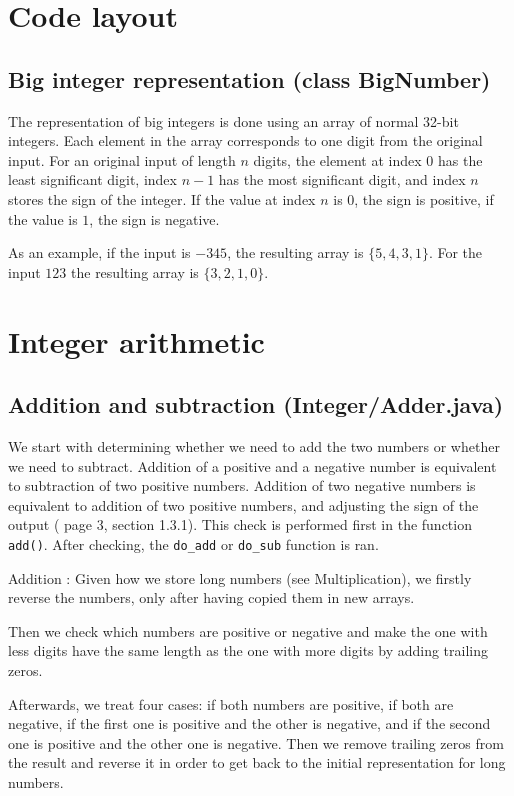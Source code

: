\documentclass[a4paper]{article}
\begin{document}
\section{Code layout}

\subsection{Big integer representation (class BigNumber)}

The representation of big integers is done using an array of normal 32-bit integers.
Each element in the array corresponds to one digit from the original input.
For an original input of length $n$ digits, the element at index $0$ has the least significant digit,
index $n-1$ has the most significant digit, and index $n$ stores the sign of the integer.
If the value at index $n$ is 0, the sign is positive, if the value is $1$, the sign is negative.

As an example, if the input is $-345$, the resulting array is $\{5, 4, 3, 1\}$.
For the input $123$ the resulting array is $\{3, 2, 1, 0\}$.


\section{Integer arithmetic}

\subsection{Addition and subtraction (Integer/Adder.java)}

We start with determining whether we need to add the two numbers or whether we need to subtract.
Addition of a positive and a negative number is equivalent to subtraction of two positive numbers.
Addition of two negative numbers is equivalent to addition of two positive numbers, and adjusting the sign of the output
(\cite{ant} page 3, section 1.3.1).
This check is performed first in the function \texttt{add()}.
After checking, the \texttt{do\_add} or \texttt{do\_sub} function is ran.

Addition : Given how we store long numbers (see Multiplication), we firstly reverse the numbers, only after having copied them in new arrays. 

Then we check which numbers are positive or negative and make the  one with less digits have the same length as the one with more digits by adding trailing zeros. 

Afterwards, we treat four cases: if both numbers are positive, if both are negative, if the first one is positive and the other is negative, and if the second one is positive and the other one is negative. Then we remove trailing zeros from the result and reverse it in order to get back to the initial representation for long numbers.
\end{document}
